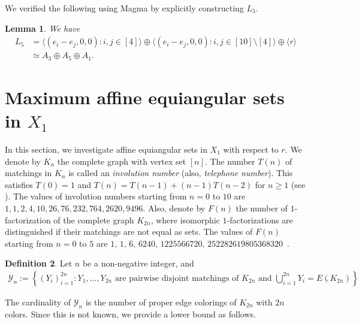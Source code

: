 \documentclass[reqno, 11pt]{amsart}
\numberwithin{equation}{section}
\newtheorem{lem}{Lemma}[section]
\theoremstyle{definition}
\newtheorem{dfn}[lem]{Definition}%
\newcommand{\cY}{\mathcal{Y}}
\newcommand{\sr}{ r } %
\begin{document}
We verified the following using Magma by explicitly constructing $L_5$.
\begin{lem}	\label{lem:L5}
	We have
	\begin{align*}
		L_5 & = \langle (e_i-e_j,0,0) : i,j \in [4] \rangle \oplus \langle (e_i-e_j ,0,0): i,j \in [10]\setminus[4] \rangle \oplus \langle \sr \rangle \\
		    & \simeq A_3 \oplus A_5 \oplus A_1.
	\end{align*}
\end{lem}



\section{Maximum affine equiangular sets in $X_1$}	\label{sec:X1}
In this section, we investigate affine equiangular sets in $X_1$ with respect to $\sr$.
We denote by $K_n$ the complete graph with vertex set $[n]$.
The number $T(n)$ of matchings in $K_n$ is called an \emph{involution number} (also, \emph{telephone number}).
This satisfies $T(0)=1$ and $T(n) = T(n-1) + (n-1)T(n-2)$ for $n \geq 1$
(see \cite[p.~85, Problem 17(d)]{MR1949650}).
The values of involution numbers starting from $n=0$ to $10$ are $1, 1, 2, 4, 10, 26, 76, 232, 764, 2620, 9496$. %
Also, denote by $F(n)$ the number of $1$-factorization of the complete graph $K_{2n}$, where isomorphic $1$-factorizations are distinguished if their matchings are not equal as sets.
The values of $F(n)$ starting from $n=0$ to $5$ are $1$, $1$, $6$, $6240$, $1225566720$, $252282619805368320$~\cite{DGM94}. %

\begin{dfn}
	Let $n$ be a non-negative integer, and
	\begin{align*}
		\cY_n := \left\{ (Y_i)_{i=1}^{2n} : Y_1, \ldots, Y_{2n} \text{ are pairwise disjoint matchings of $K_{2n}$ and } \bigcup_{i=1}^{2n} Y_i = E(K_{2n})  \right\}.
	\end{align*}
\end{dfn}
The cardinality of $\cY_n$ is the number of proper edge colorings of $K_{2n}$ with $2n$ colors.
Since this is not known, we provide a lower bound as follows.
\end{document}
